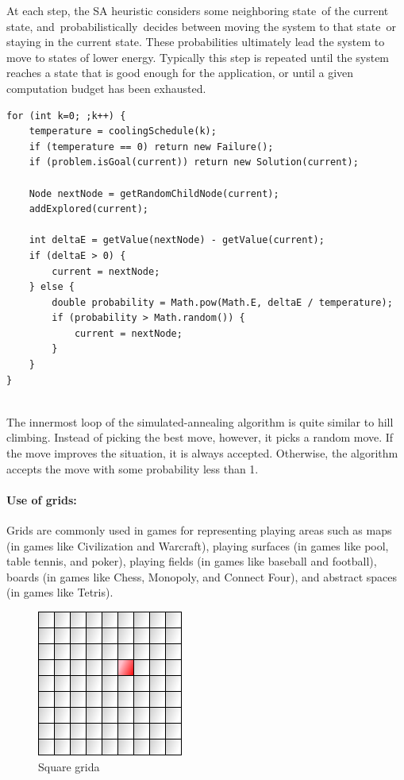 \documentclass[a4paper]{article}
\begin{document}
At each step, the SA heuristic considers some neighboring state of the current state, and probabilistically decides between moving the system to that state or staying in the current state. These probabilities ultimately lead the system to move to states of lower energy. Typically this step is repeated until the system reaches a state that is good enough for the application, or until a given computation budget has been exhausted.

\begin{lstlisting}
for (int k=0; ;k++) {
    temperature = coolingSchedule(k);
    if (temperature == 0) return new Failure();
    if (problem.isGoal(current)) return new Solution(current);

    Node nextNode = getRandomChildNode(current);
    addExplored(current);

    int deltaE = getValue(nextNode) - getValue(current);
    if (deltaE > 0) {
        current = nextNode;
    } else {
        double probability = Math.pow(Math.E, deltaE / temperature);
        if (probability > Math.random()) {
            current = nextNode;
        }
    }
}
\end{lstlisting}

\noindent \\
The innermost loop of the simulated-annealing algorithm is quite similar to hill climbing. Instead of picking the best move, however, it picks a random move. If the move improves the situation, it is always accepted. Otherwise, the algorithm accepts the move with some probability less than 1.

\paragraph{Use of grids:} Grids are commonly used in games for representing playing areas such as maps (in games like Civilization and Warcraft), playing surfaces (in games like pool, table tennis, and poker), playing fields (in games like baseball and football), boards (in games like Chess, Monopoly, and Connect Four), and abstract spaces (in games like Tetris). \\

\begin{figure}[h!]
  \centering
    \includegraphics[scale=.6]{images/square-grid.png}
  \caption{Square grida}
\end{figure}
\end{document}
